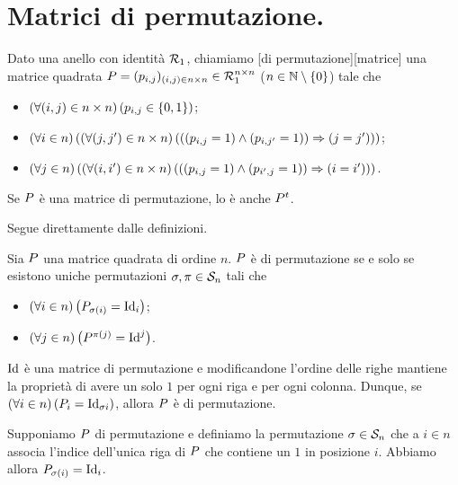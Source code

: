 \section{Matrici di permutazione.}
\label{Matrici_MatriciDiPermutazione}
\begin{Definition}
	Dato una anello con identit\`a $\mathcal{R}_1$, chiamiamo [di permutazione][matrice] una matrice quadrata $P = (p_{i,j})_{(i,j) \in n \times n} \in \mathcal{R}_1^{n \times n}$ ($n \in \mathbb{N} \setminus \lbrace 0 \rbrace$) tale che
\begin{itemize}
	\item $\left ( \forall (i,j) \in n \times n \right ) \left ( p_{i,j} \in \lbrace 0, 1 \rbrace \right )$;
	\item $\left ( \forall i \in n \right ) \left ( \left ( \forall (j,j') \in n \times n \right ) \left ( \left ( \left ( p_{i,j} = 1 \right ) \wedge \left ( p_{i,j'} = 1 \right ) \right ) \Rightarrow \left ( j = j' \right ) \right ) \right )$;
	\item $\left ( \forall j \in n \right ) \left ( \left ( \forall (i,i') \in n \times n \right ) \left ( \left ( \left ( p_{i,j} = 1 \right ) \wedge \left ( p_{i',j} = 1 \right ) \right ) \Rightarrow \left ( i = i' \right ) \right ) \right )$.
\end{itemize}
\end{Definition}
\begin{Theorem}
	Se $P$ \`e una matrice di permutazione, lo \`e anche ${P}^t$.
\end{Theorem}
\Proof Segue direttamente dalle definizioni. \EndProof
\begin{Theorem}
	Sia $P$ una matrice quadrata di ordine $n$. $P$ \`e di permutazione se e solo se esistono uniche permutazioni $\Permutation, \VarPermutation \in \SymmetricGroup{n}$ tali che
	\begin{itemize}
		\item $\ForAll{i \in n}{\PermutationMatrix_{\Permutation(i)} = \Identity_i}$;
		\item $\ForAll{j \in n}{\PermutationMatrix^{\VarPermutation(j)} = \Identity^j}$.
	\end{itemize}
\end{Theorem}
\Proof $\Identity$ \`e una matrice di permutazione e modificandone l'ordine delle righe mantiene la propriet\`a di avere un solo $1$ per ogni riga e per ogni colonna. Dunque, se $\ForAll{i \in n}{\PermutationMatrix_i = \Identity_{\Permutation{i}}}$, allora $P$ \`e di permutazione.
\par Supponiamo $P$ di permutazione e definiamo la permutazione $\Permutation \in \SymmetricGroup{n}$ che a $i \in n$ associa l'indice dell'unica riga di $P$ che contiene un $1$ in posizione $i$. Abbiamo allora $\PermutationMatrix_{\Permutation(i)} = \Identity_i$.
